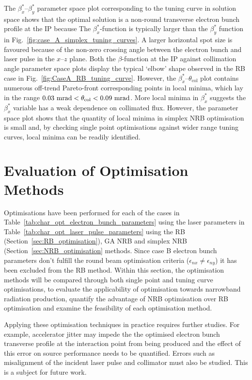 \documentclass[../main.tex]{subfiles}
\begin{document}
The $\beta_{x}^{*}$--$\beta_{y}^{*}$ parameter space plot corresponding to the tuning curve in solution space shows that the optimal solution is a non-round transverse electron bunch profile at the IP because The $\beta_{x}^{*}$-function is typically larger than the $\beta_{y}^{*}$ function in Fig.~\ref{fig:case_A_simplex_tuning_curves}. A larger horizontal spot size is favoured because of the non-zero crossing angle between the electron bunch and laser pulse in the $x$--$z$ plane. Both the $\beta$-function at the IP against collimation angle parameter space plots display the typical `elbow' shape observed in the RB case in Fig.~\ref{fig:CaseA_RB_tuning_curve}. However, the $\beta_{x}^{*}$--$\theta_{\mathrm{col}}$ plot contains numerous off-trend Pareto-front corresponding points in local minima, which lay in the range $0.03~\textrm{\si{\milli\radian}} < \theta_{\mathrm{col}} < 0.09~\mathrm{\si{\milli\radian}}$. More local minima in $\beta_{x}^{*}$ suggests the $\beta_{x}^{*}$ variable has a weak dependence on collimated flux. However, the parameter space plot shows that the quantity of local minima in simplex NRB optimisation is small and, by checking single point optimisations against wider range tuning curves, local minima can be readily identified.

\section{Evaluation of Optimisation Methods} 
\label{sec:evaluation_of_optimisation_methods}

Optimisations have been performed for each of the cases in Table~\ref{tab:char_opt_electron_bunch_parameters} using the laser parameters in Table~\ref{tab:char_opt_laser_pulse_parameters} using the RB (Section~\ref{sec:RB_optimisation}), GA NRB and simplex NRB (Section~\ref{sec:NRB_optimisation} methods. Since case B electron bunch parameters don't fulfill the round beam optimisation criteria ($\epsilon_{nx}\neq\epsilon_{ny}$) it has been excluded from the RB method. Within this section, the optimisation methods will be compared through both single point and tuning curve optimisations, to evaluate the applicability of optimisation towards narrowband radiation production, quantify the advantage of NRB optimisation over RB optimisation and examine the feasibility of each optimisation method. 

Applying these optimisation techniques in practice requires further studies. For example, accelerator jitter may impede the the optimised electron bunch transverse profile at the interaction point from being produced and the effect of this error on source performance needs to be quantified. Errors such as misalignment of the incident laser pulse and collimator must also be studied. This is a subject for future work.  
\end{document}
